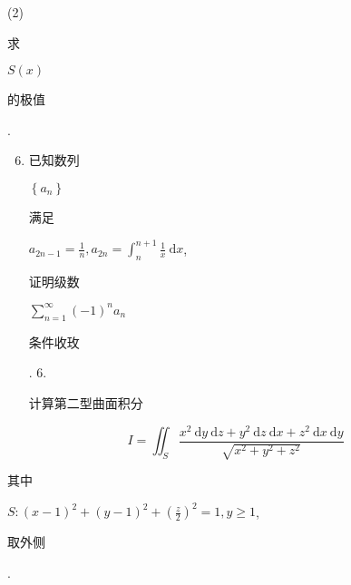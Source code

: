 \documentclass[10pt]{article}
\begin{document}
(2) \begin{CJK}{UTF8}{mj}求\end{CJK} $S(x)$ \begin{CJK}{UTF8}{mj}的极值\end{CJK}.

\begin{enumerate}
  \setcounter{enumi}{5}
  \item \begin{CJK}{UTF8}{mj}已知数列\end{CJK} $\left\{a_{n}\right\}$ \begin{CJK}{UTF8}{mj}满足\end{CJK} $a_{2 n-1}=\frac{1}{n}, a_{2 n}=\int_{n}^{n+1} \frac{1}{x} \mathrm{~d} x$, \begin{CJK}{UTF8}{mj}证明级数\end{CJK} $\sum_{n=1}^{\infty}(-1)^{n} a_{n}$ \begin{CJK}{UTF8}{mj}条件收玫\end{CJK}. 6. \begin{CJK}{UTF8}{mj}计算第二型曲面积分\end{CJK}
\end{enumerate}
$$
I=\iint_{S} \frac{x^{2} \mathrm{~d} y \mathrm{~d} z+y^{2} \mathrm{~d} z \mathrm{~d} x+z^{2} \mathrm{~d} x \mathrm{~d} y}{\sqrt{x^{2}+y^{2}+z^{2}}}
$$
\begin{CJK}{UTF8}{mj}其中\end{CJK} $S:(x-1)^{2}+(y-1)^{2}+\left(\frac{z}{2}\right)^{2}=1, y \geq 1$, \begin{CJK}{UTF8}{mj}取外侧\end{CJK}.
\end{document}
